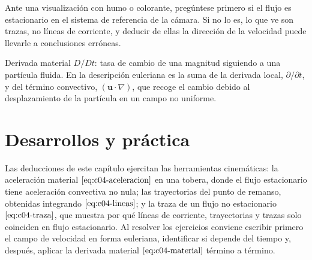 \documentclass[10pt,openany]{book}
\begin{document}
\begin{tcolorbox}[title={Consejo}, studiumtip, breakable]

Ante una visualización con humo o colorante, pregúntese primero si el flujo es estacionario en el sistema de referencia de la cámara. Si no lo es, lo que ve son trazas, no líneas de corriente, y deducir de ellas la dirección de la velocidad puede llevarle a conclusiones erróneas.
\end{tcolorbox}

\begin{tcolorbox}[title={Definición}, studiumdef, breakable]

Derivada material \(D/Dt\): tasa de cambio de una magnitud siguiendo a una partícula fluida. En la descripción euleriana es la suma de la derivada local, \(\partial/\partial t\), y del término convectivo, \((\mathbf{u}\cdot\nabla)\), que recoge el cambio debido al desplazamiento de la partícula en un campo no uniforme.
\end{tcolorbox}



\section{Desarrollos y práctica}

Las deducciones de este capítulo ejercitan las herramientas cinemáticas: la aceleración material \(\eqref{eq:c04-aceleracion}\) en una tobera, donde el flujo estacionario tiene aceleración convectiva no nula; las trayectorias del punto de remanso, obtenidas integrando \(\eqref{eq:c04-lineas}\); y la traza de un flujo no estacionario \(\eqref{eq:c04-traza}\), que muestra por qué líneas de corriente, trayectorias y trazas solo coinciden en flujo estacionario. Al resolver los ejercicios conviene escribir primero el campo de velocidad en forma euleriana, identificar si depende del tiempo y, después, aplicar la derivada material \(\eqref{eq:c04-material}\) término a término.
\end{document}
